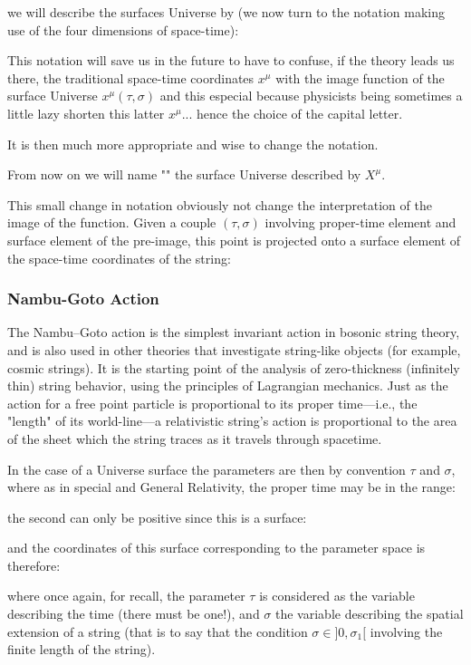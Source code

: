	we will describe the surfaces Universe by (we now turn to the notation making use of the four dimensions of space-time):
	
	This notation will save us in the future to have to confuse, if the theory leads us there, the traditional space-time coordinates $x^\mu$ with the image function of the surface Universe $x^\mu(\tau,\sigma)$  and this especial because physicists being sometimes a little lazy shorten this latter $x^\mu$... hence the choice of the capital letter.
	
	It is then much more appropriate and wise to change the notation.
	
	From now on we will name "" the surface Universe described by $X^\mu$.
	
	This small change in notation obviously not change the interpretation of the image of the function. Given a couple $(\tau,\sigma)$ involving proper-time element and surface element of the pre-image, this point is projected onto a surface element of the space-time coordinates of the string:
	
	
	\subsubsection{Nambu-Goto Action}
	The Nambu–Goto action is the simplest invariant action in bosonic string theory, and is also used in other theories that investigate string-like objects (for example, cosmic strings). It is the starting point of the analysis of zero-thickness (infinitely thin) string behavior, using the principles of Lagrangian mechanics. Just as the action for a free point particle is proportional to its proper time—i.e., the "length" of its world-line—a relativistic string's action is proportional to the area of the sheet which the string traces as it travels through spacetime.
	
	In the case of a Universe surface the parameters are then by convention $\tau$ and $\sigma$, where as in special and General Relativity, the proper time may be in the range:
	
	the second can only be positive since this is a surface:
	
	and the coordinates of this surface corresponding to the parameter space is therefore:
	
	where once again, for recall, the parameter $\tau$ is considered as the variable describing the time (there must be one!), and $\sigma$ the variable describing the spatial extension of a string (that is to say that the condition $\sigma\in]0,\sigma_1[$ involving the finite length of the string).

